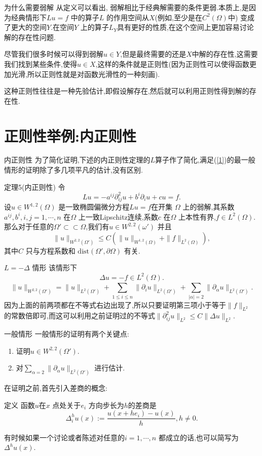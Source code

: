 \begin{frame}[t]{为什么需要弱解}
  从定义可以看出, 弱解相比于经典解需要的条件更弱.本质上,是因为经典情形下$Lu=f$ 中的算子$L$ 的作用空间从$X$(例如,至少是在$C^2(\Omega)$中) 变成了更大的空间$Y$.在空间$Y$ 上的算子$L_Y$具有更好的性质,在这个空间上更加容易讨论解的存在性问题.

  尽管我们很多时候可以得到弱解$u\in Y$,但是最终需要的还是$X$中解的存在性,这需要我们找到某些条件,使得$u \in X$,这样的条件就是正则性(因为正则性可以使得函数更加光滑,所以正则性就是对函数光滑性的一种刻画).

  这种正则性往往是一种先验估计,即假设解存在,然后就可以利用正则性得到解的存在性.
\end{frame}
\section{正则性举例:内正则性}
\begin{frame}[t]{内正则性}
  为了简化证明,下述的内正则性定理的$L$算子作了简化,满足(\ref{1})的最一般情形的证明除了多几项平凡的估计,没有区别.
  \begin{alertblock}{定理5(内正则性)}
  令
  \[
    Lu = -a^{ij}\partial^2_{ij}u+b^i \partial_i u +cu=f.
  \] 
  设$u\in W^{1,2}(\Omega)$ 是一致椭圆偏微分方程$Lu=f$在开集 $\Omega$ 上的弱解,其系数$a^{ij},b^i,i,j=1,\cdots,n$ 在$\Omega$ 上一致Lipschitz连续,系数$c$ 在$\Omega$ 上本性有界,$f\in L^{2}(\Omega)$.那么对于任意的$\Omega'\subset \subset \Omega$,我们有$u\in W^{2,2}(\omega')$ 并且
  \begin{equation}
    \|u\|_{W^{2,2}(\Omega')}\le C\left( \|u\|_{W^{1,2}(\Omega)}+\|f\|_{L^{2}(\Omega)} \right), 
  \end{equation}
  其中$C$ 只与方程系数和 $\mathrm{dist}(\Omega',\partial \Omega)$ 有关.
  \end{alertblock}
\end{frame}

\begin{frame}{$L=-\Delta$ 情形}
  该情形下
  \[
    \Delta u = -f\in L^{2}(\Omega).
  \]
  \[
    \|u\|_{W^{2,2}(\Omega')}=\|u\|_{L^{2}(\Omega')}+\sum_{1\le i\le n}^{} \|\partial_i u\|_{L^{2}(\Omega')}+\sum_{|\alpha|=2} \|\partial_{\alpha}u\|_{L^2(\Omega')}.
  \]
  因为上面的前两项都在不等式右边出现了,所以只要证明第三项小于等于$\|f\|_{L^{2}}$ 的常数倍即可,而这可以利用之前证明过的不等式$\|\partial^2_{ij}u\|_{L^{2}}\le C \|\Delta u\|_{L^{2}}$.
\end{frame}

\begin{frame}[t]{一般情形}
  一般情形的证明有两个关键点:
  \begin{enumerate}
    \item 证明$u \in W^{2,2}(\Omega')$.
    \item 对$\sum_{\alpha=2}\|\partial_{\alpha} u\|_{L^2(\Omega')}$ 进行估计.
  \end{enumerate}
在证明之前,首先引入差商的概念:
\begin{block}{定义}
  函数$u$在$x$ 点处关于$e_i$ 方向步长为$h$的差商是
  \[
    \Delta_i^{h}u(x):= \frac{u(x+he_i)-u(x)}{h}, h\neq 0.
  \] 
\end{block}
有时候如果一个讨论或者陈述对任意的$i=1,\cdots,n$ 都成立的话,也可以简写为$\Delta^{h}u(x)$.
\end{frame}

